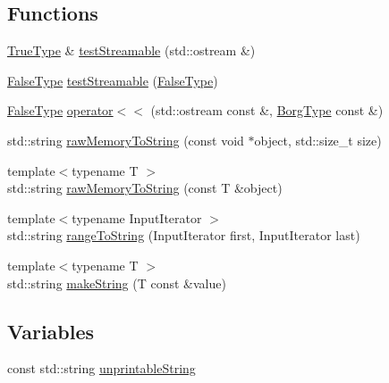 \subsection*{Functions}
\begin{DoxyCompactItemize}
\item 
\hyperlink{struct_catch_1_1_detail_1_1_true_type}{True\-Type} \& \hyperlink{namespace_catch_1_1_detail_aff0ca0f561ad8053654ab27d54486197}{test\-Streamable} (std\-::ostream \&)
\item 
\hyperlink{struct_catch_1_1_detail_1_1_false_type}{False\-Type} \hyperlink{namespace_catch_1_1_detail_aac81f01b0d687f75b8f24a925591b7ac}{test\-Streamable} (\hyperlink{struct_catch_1_1_detail_1_1_false_type}{False\-Type})
\item 
\hyperlink{struct_catch_1_1_detail_1_1_false_type}{False\-Type} \hyperlink{namespace_catch_1_1_detail_ae9a44d574c4fbd18fabaaee05a433d88}{operator$<$$<$} (std\-::ostream const \&, \hyperlink{struct_catch_1_1_detail_1_1_borg_type}{Borg\-Type} const \&)
\item 
std\-::string \hyperlink{namespace_catch_1_1_detail_ac5d6c510e565ee5bddcc2236194ce29e}{raw\-Memory\-To\-String} (const void $\ast$object, std\-::size\-\_\-t size)
\item 
{\footnotesize template$<$typename T $>$ }\\std\-::string \hyperlink{namespace_catch_1_1_detail_a371620ed524abfcae5c3772bf49b563a}{raw\-Memory\-To\-String} (const T \&object)
\item 
{\footnotesize template$<$typename Input\-Iterator $>$ }\\std\-::string \hyperlink{namespace_catch_1_1_detail_a6650a1dff325bf29962ff15ae73fd972}{range\-To\-String} (Input\-Iterator first, Input\-Iterator last)
\item 
{\footnotesize template$<$typename T $>$ }\\std\-::string \hyperlink{namespace_catch_1_1_detail_aef46b4178e08758524d25d1d969a503c}{make\-String} (T const \&value)
\end{DoxyCompactItemize}
\subsection*{Variables}
\begin{DoxyCompactItemize}
\item 
const std\-::string \hyperlink{namespace_catch_1_1_detail_a466775f4eec29ffef29ab334cd885136}{unprintable\-String}
\end{DoxyCompactItemize}


